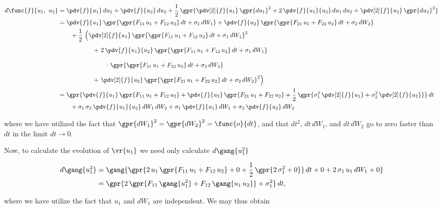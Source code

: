 \begin{enumerate}[a)]
	\begin{align}
		d\func{f}{u_1,\ u_2} &= \pdv{f}{u_1}\,du_1 + \pdv{f}{u_2}\,du_2 + \frac{1}{2}\,\gpr{\pdv[2]{f}{u_1}\,\gpr{du_1}^2 + 2\,\pdv{f}{u_1}{u_2}\,du_1\,du_2 + \pdv[2]{f}{u_2}\,\gpr{du_2}^2} \nonumber \\
			&= \pdv{f}{u_1}\,\gpr{\gpr{F_{11}\,u_1 + F_{12}\,u_2}\,dt + \sigma_1\,dW_1} + \pdv{f}{u_2}\,\gpr{\gpr{F_{21}\,u_1 + F_{22}\,u_2}\,dt + \sigma_2\,dW_2} \nonumber \\
				&\qquad + \frac{1}{2}\,\left( \pdv[2]{f}{u_1}\,\gpr{\gpr{F_{11}\,u_1 + F_{12}\,u_2}\,dt + \sigma_1\,dW_1}^2 \right. \nonumber \\
				&\qquad\qquad \phantom{+ \frac{1}{2}} + \left. 2\,\pdv{f}{u_1}{u_2}\,\gpr{\gpr{F_{11}\,u_1 + F_{12}\,u_2}\,dt + \sigma_1\,dW_1} \right. \nonumber \\
				&\qquad\qquad\qquad \phantom{+ \frac{1}{2}} \cdot \left. \gpr{\gpr{F_{21}\,u_1 + F_{22}\,u_2}\,dt + \sigma_2\,dW_2} \right. \nonumber \\
				&\qquad\qquad \phantom{+ \frac{1}{2}} + \left. \pdv[2]{f}{u_2}\,\gpr{\gpr{F_{21}\,u_1 + F_{22}\,u_2}\,dt + \sigma_2\,dW_2}^2 \right) \nonumber \\
			&= \gpr{\pdv{f}{u_1}\,\gpr{F_{11}\,u_1 + F_{12}\,u_2} + \pdv{f}{u_2}\,\gpr{F_{21}\,u_1 + F_{22}\,u_2} + \frac{1}{2}\,\gpr{\sigma_1^2\,\pdv[2]{f}{u_1} + \sigma_2^2\,\pdv[2]{f}{u_2}}}\,dt \nonumber \\
			&\qquad + \sigma_1\,\sigma_2\,\pdv{f}{u_1}{u_2}\,dW_1\,dW_2 + \sigma_1\,\pdv{f}{u_1}\,dW_1 + \sigma_2\,\pdv{f}{u_2}\,dW_2
	\end{align}
	
	where we have utilized the fact that $\gpr{dW_1}^2 = \gpr{dW_2}^2 = \func{o}{dt}$, and that $dt^2$, $dt\,dW_1$, and $dt\,dW_2$ go to zero faster than $dt$ in the limit $dt \to 0$.
	
	Now, to calculate the evolution of $\vr{u_1}$ we need only calculate $d\gang{u_1^2}$
	
	\begin{align}
		d\gang{u_1^2} &= \gang{\gpr{2\,u_1\,\gpr{F_{11}\,u_1 + F_{12}\,u_2} + 0 + \frac{1}{2}\,\gpr{2\,\sigma_1^2 + 0}}\,dt + 0 + 2\,\sigma_1\,u_1\,dW_1 + 0} \nonumber \\
			&= \gpr{2\,\gpr{F_{11}\,\gang{u_1^2} + F_{12}\,\gang{u_1\,u_2}} + \sigma_1^2}\,dt,
	\end{align}
	
	where we have utilize the fact that $u_1$ and $dW_1$ are independent. We may thus obtain
	

\end{enumerate}
